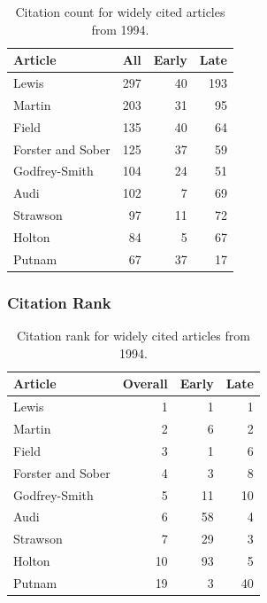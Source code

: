 \documentclass[
  10pt,
  letterpaper,
  DIV=11,
  numbers=noendperiod,
  twoside]{scrartcl}
\begin{document}
\begin{longtable}[]{@{}lrrr@{}}

\caption{\label{tbl-citation-count-1994}Citation count for widely cited
articles from 1994.}

\tabularnewline

\toprule\noalign{}
Article & All & Early & Late \\
\midrule\noalign{}
\endhead
\bottomrule\noalign{}
\endlastfoot
Lewis & 297 & 40 & 193 \\
Martin & 203 & 31 & 95 \\
Field & 135 & 40 & 64 \\
Forster and Sober & 125 & 37 & 59 \\
Godfrey-Smith & 104 & 24 & 51 \\
Audi & 102 & 7 & 69 \\
Strawson & 97 & 11 & 72 \\
Holton & 84 & 5 & 67 \\
Putnam & 67 & 37 & 17 \\

\end{longtable}

\subsubsection*{Citation Rank}\label{sec-rank-1994}

\begin{longtable}[]{@{}lrrr@{}}

\caption{\label{tbl-citation-rank-1994}Citation rank for widely cited
articles from 1994.}

\tabularnewline

\toprule\noalign{}
Article & Overall & Early & Late \\
\midrule\noalign{}
\endhead
\bottomrule\noalign{}
\endlastfoot
Lewis & 1 & 1 & 1 \\
Martin & 2 & 6 & 2 \\
Field & 3 & 1 & 6 \\
Forster and Sober & 4 & 3 & 8 \\
Godfrey-Smith & 5 & 11 & 10 \\
Audi & 6 & 58 & 4 \\
Strawson & 7 & 29 & 3 \\
Holton & 10 & 93 & 5 \\
Putnam & 19 & 3 & 40 \\

\end{longtable}
\end{document}
